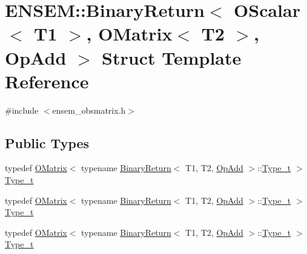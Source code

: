 \hypertarget{structENSEM_1_1BinaryReturn_3_01OScalar_3_01T1_01_4_00_01OMatrix_3_01T2_01_4_00_01OpAdd_01_4}{}\section{E\+N\+S\+EM\+:\+:Binary\+Return$<$ O\+Scalar$<$ T1 $>$, O\+Matrix$<$ T2 $>$, Op\+Add $>$ Struct Template Reference}
\label{structENSEM_1_1BinaryReturn_3_01OScalar_3_01T1_01_4_00_01OMatrix_3_01T2_01_4_00_01OpAdd_01_4}


{\ttfamily \#include $<$ensem\+\_\+obsmatrix.\+h$>$}

\subsection*{Public Types}
\begin{DoxyCompactItemize}
\item 
typedef \mbox{\hyperlink{classENSEM_1_1OMatrix}{O\+Matrix}}$<$ typename \mbox{\hyperlink{structENSEM_1_1BinaryReturn}{Binary\+Return}}$<$ T1, T2, \mbox{\hyperlink{structENSEM_1_1OpAdd}{Op\+Add}} $>$\+::\mbox{\hyperlink{structENSEM_1_1BinaryReturn_3_01OScalar_3_01T1_01_4_00_01OMatrix_3_01T2_01_4_00_01OpAdd_01_4_ad9eaea6a80091a12d02ff490903ae0bd}{Type\+\_\+t}} $>$ \mbox{\hyperlink{structENSEM_1_1BinaryReturn_3_01OScalar_3_01T1_01_4_00_01OMatrix_3_01T2_01_4_00_01OpAdd_01_4_ad9eaea6a80091a12d02ff490903ae0bd}{Type\+\_\+t}}
\item 
typedef \mbox{\hyperlink{classENSEM_1_1OMatrix}{O\+Matrix}}$<$ typename \mbox{\hyperlink{structENSEM_1_1BinaryReturn}{Binary\+Return}}$<$ T1, T2, \mbox{\hyperlink{structENSEM_1_1OpAdd}{Op\+Add}} $>$\+::\mbox{\hyperlink{structENSEM_1_1BinaryReturn_3_01OScalar_3_01T1_01_4_00_01OMatrix_3_01T2_01_4_00_01OpAdd_01_4_ad9eaea6a80091a12d02ff490903ae0bd}{Type\+\_\+t}} $>$ \mbox{\hyperlink{structENSEM_1_1BinaryReturn_3_01OScalar_3_01T1_01_4_00_01OMatrix_3_01T2_01_4_00_01OpAdd_01_4_ad9eaea6a80091a12d02ff490903ae0bd}{Type\+\_\+t}}
\item 
typedef \mbox{\hyperlink{classENSEM_1_1OMatrix}{O\+Matrix}}$<$ typename \mbox{\hyperlink{structENSEM_1_1BinaryReturn}{Binary\+Return}}$<$ T1, T2, \mbox{\hyperlink{structENSEM_1_1OpAdd}{Op\+Add}} $>$\+::\mbox{\hyperlink{structENSEM_1_1BinaryReturn_3_01OScalar_3_01T1_01_4_00_01OMatrix_3_01T2_01_4_00_01OpAdd_01_4_ad9eaea6a80091a12d02ff490903ae0bd}{Type\+\_\+t}} $>$ \mbox{\hyperlink{structENSEM_1_1BinaryReturn_3_01OScalar_3_01T1_01_4_00_01OMatrix_3_01T2_01_4_00_01OpAdd_01_4_ad9eaea6a80091a12d02ff490903ae0bd}{Type\+\_\+t}}
\end{DoxyCompactItemize}


